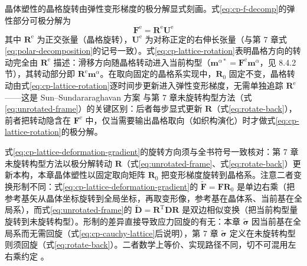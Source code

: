 晶体塑性的晶格旋转由弹性变形梯度的极分解显式刻画。式\eqref{eq:cp-f-decomp}的弹性部分可极分解为
\begin{equation}
  \mathbf{F}^{\mathrm{e}}=\mathbf{R}^{\mathrm{e}}\mathbf{U}^{\mathrm{e}}
  \label{eq:cp-lattice-rotation}
\end{equation}
其中 $\mathbf{R}^{\mathrm{e}}$ 为正交张量（晶格旋转），$\mathbf{U}^{\mathrm{e}}$ 为对称正定的右伸长张量（与第 7 章式\eqref{eq:polar-decomposition}的记号一致）。式\eqref{eq:cp-lattice-rotation}表明晶格方向的转动完全由 $\mathbf{R}^{\mathrm{e}}$ 描述：滑移方向随晶格转动进入当前构型（$\mathbf{m}^{\alpha*}=\mathbf{F}^{\mathrm{e}}\mathbf{m}^{\alpha}$，见 8.4.2 节），其转动部分即 $\mathbf{R}^{\mathrm{e}}\mathbf{m}^{\alpha}$。在取向固定的晶格系实现中，$\mathbf{R}_{0}$ 固定不变，晶格转动由式\eqref{eq:cp-lattice-rotation}逐时间步更新进入弹性变形梯度，无需单独追踪 $\mathbf{R}^{\mathrm{e}}$——这是 Sun--Sundararaghavan 方案 \cite{SunSundararaghavan2014} 与第 7 章未旋转构型方法（式\eqref{eq:unrotated-frame}）的关键区别：后者每步显式更新 $\mathbf{R}$（式\eqref{eq:rotate-back}），前者把转动隐含在 $\mathbf{F}^{\mathrm{e}}$ 中，仅当需要输出晶格取向（如织构演化）时才做式\eqref{eq:cp-lattice-rotation}的极分解。

\begin{remark}
  式\eqref{eq:cp-lattice-deformation-gradient}的旋转方向须与全书符号一致核对：第 7 章未旋转构型方法以极分解转动 $\mathbf{R}$（式\eqref{eq:unrotated-frame}、式\eqref{eq:rotate-back}）更新本构，本章晶体塑性以固定取向矩阵 $\mathbf{R}_{0}$ 把变形梯度旋转到晶格系。注意二者变换形制不同：式\eqref{eq:cp-lattice-deformation-gradient}的 $\tilde{\mathbf{F}}=\mathbf{F}\mathbf{R}_{0}$ 是单边右乘（把参考基矢从晶体坐标旋转到全局坐标，再取变形像，参考基在晶体系、当前基在全局系），而式\eqref{eq:unrotated-frame}的 $\tilde{\mathbf{D}}=\mathbf{R}^{\mathrm{T}}\mathbf{D}\mathbf{R}$ 是双边相似变换（把当前构型量旋转到未旋转构型）。形制的差异直接导致应力回旋的有无：本章 $\tilde{\boldsymbol{\sigma}}$ 因当前基在全局系而无需回旋（式\eqref{eq:cp-cauchy-lattice}后说明），第 7 章 $\tilde{\boldsymbol{\sigma}}$ 定义在未旋转构型则须回旋（式\eqref{eq:rotate-back}）。二者数学上等价、实现路径不同，切不可混用左右乘约定 \cite{SunSundararaghavan2014}。
\end{remark}

